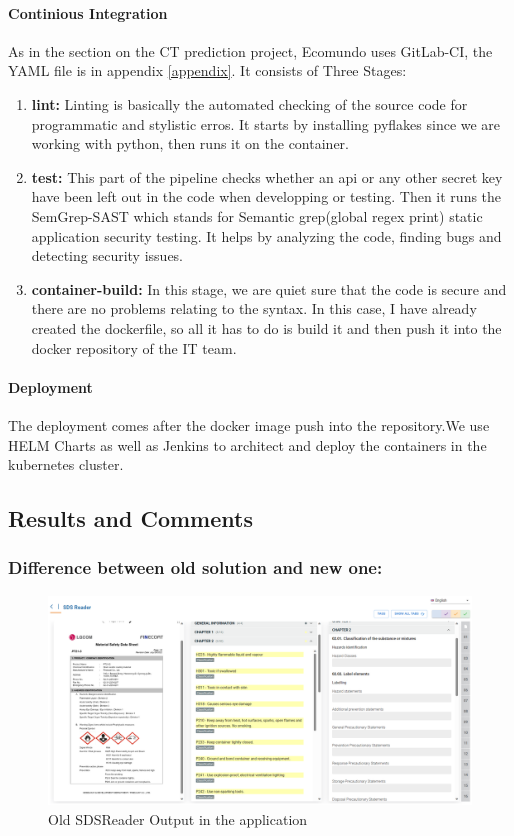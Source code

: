 \documentclass[a4paper,12pt,twoside]{report}
\begin{document}
\paragraph{Continious Integration}
As in the section on the CT prediction project, Ecomundo uses GitLab-CI, the YAML file is in appendix \ref{appendix}. It consists of Three Stages:
\begin{enumerate}
\item \textbf{lint:} Linting is basically the automated checking of the source code for programmatic and stylistic erros. It starts by installing pyflakes since we are working with python, then runs it on the container.
\item \textbf{test:} This part of the pipeline checks whether an api or any other secret key have been left out in the code when developping or testing. Then it runs the SemGrep-SAST which stands for Semantic grep(global regex print) static application security testing. It helps by analyzing the code, finding bugs and detecting security issues.
\item \textbf{container-build:} In this stage, we are quiet sure that the code is secure and there are no problems relating to the syntax. In this case, I have already created the dockerfile, so all it has to do is build it and then push it into the docker repository of the IT team.
\end{enumerate}

\paragraph{Deployment}
The deployment comes after the docker image push into the repository.We use HELM Charts as well as Jenkins to architect and deploy the containers in the kubernetes cluster. 
\subsection{Results and Comments}
\subsubsection{Difference between old solution and new one:}

\begin{figure}
		\includegraphics[width=\textwidth, keepaspectratio ]{images/oldSDSReader}
	\caption[Old SDSReader]{Old SDSReader Output in the application}
\label{oldSDSReader}
\end{figure}
\end{document}
